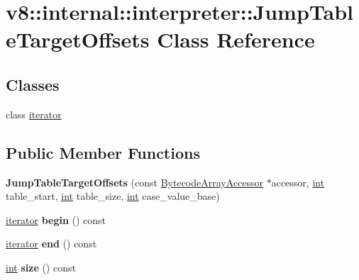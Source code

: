 \hypertarget{classv8_1_1internal_1_1interpreter_1_1JumpTableTargetOffsets}{}\section{v8\+:\+:internal\+:\+:interpreter\+:\+:Jump\+Table\+Target\+Offsets Class Reference}
\label{classv8_1_1internal_1_1interpreter_1_1JumpTableTargetOffsets}
\subsection*{Classes}
\begin{DoxyCompactItemize}
\item 
class \mbox{\hyperlink{classv8_1_1internal_1_1interpreter_1_1JumpTableTargetOffsets_1_1iterator}{iterator}}
\end{DoxyCompactItemize}
\subsection*{Public Member Functions}
\begin{DoxyCompactItemize}
\item 
\mbox{\label{classv8_1_1internal_1_1interpreter_1_1JumpTableTargetOffsets_abbd777a38fef0842b48d1d37519df13d}} 
{\bfseries Jump\+Table\+Target\+Offsets} (const \mbox{\hyperlink{classv8_1_1internal_1_1interpreter_1_1BytecodeArrayAccessor}{Bytecode\+Array\+Accessor}} $\ast$accessor, \mbox{\hyperlink{classint}{int}} table\+\_\+start, \mbox{\hyperlink{classint}{int}} table\+\_\+size, \mbox{\hyperlink{classint}{int}} case\+\_\+value\+\_\+base)
\item 
\mbox{\label{classv8_1_1internal_1_1interpreter_1_1JumpTableTargetOffsets_a6cd085771cdff8a16f83a49258862df5}} 
\mbox{\hyperlink{classv8_1_1internal_1_1interpreter_1_1JumpTableTargetOffsets_1_1iterator}{iterator}} {\bfseries begin} () const
\item 
\mbox{\label{classv8_1_1internal_1_1interpreter_1_1JumpTableTargetOffsets_a61ab6e1f4a5b45fa78b8f3d1ef528cb6}} 
\mbox{\hyperlink{classv8_1_1internal_1_1interpreter_1_1JumpTableTargetOffsets_1_1iterator}{iterator}} {\bfseries end} () const
\item 
\mbox{\label{classv8_1_1internal_1_1interpreter_1_1JumpTableTargetOffsets_af3e0793438d75801f81280642af002b2}} 
\mbox{\hyperlink{classint}{int}} {\bfseries size} () const
\end{DoxyCompactItemize}


